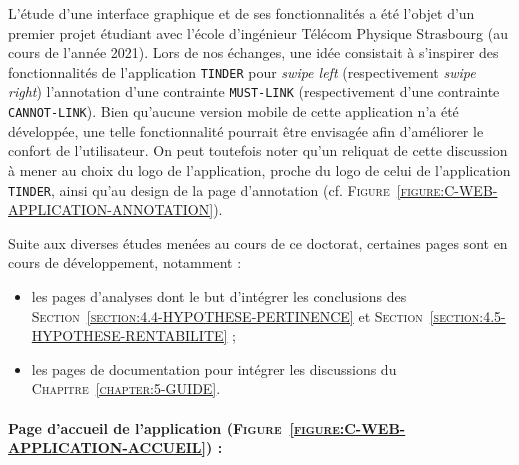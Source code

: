 	\setcounter{localCounterOfFootnoteValue}{\value{footnote}}
	\begin{leftBarInformation}
		L'étude d'une interface graphique et de ses fonctionnalités a été l'objet d'un premier projet étudiant avec l'école d'ingénieur Télécom Physique Strasbourg (au cours de l'année 2021).
		Lors de nos échanges, une idée consistait à s'inspirer des fonctionnalités de l'application \texttt{TINDER} \footnotemark pour \textit{swipe left} (respectivement \textit{swipe right}) l'annotation d'une contrainte \texttt{MUST-LINK} (respectivement d'une contrainte \texttt{CANNOT-LINK}).
		Bien qu'aucune version mobile de cette application n'a été développée, une telle fonctionnalité pourrait être envisagée afin d'améliorer le confort de l'utilisateur.
		On peut toutefois noter qu'un reliquat de cette discussion à mener au choix du logo de l'application, proche du logo de celui de l'application \texttt{TINDER}, ainsi qu'au design de la page d'annotation (cf. \textsc{Figure~\ref{figure:C-WEB-APPLICATION-ANNOTATION}}).
	\end{leftBarInformation}
	
	\begin{leftBarAuthorOpinion}
		Suite aux diverses études menées au cours de ce doctorat, certaines pages sont en cours de développement, notamment :
		\begin{itemize}
			\item les pages d'analyses dont le but d'intégrer les conclusions des \textsc{Section~\ref{section:4.4-HYPOTHESE-PERTINENCE}} et \textsc{Section~\ref{section:4.5-HYPOTHESE-RENTABILITE}} ;
			\item les pages de documentation pour intégrer les discussions du \textsc{Chapitre~\ref{chapter:5-GUIDE}}.
		\end{itemize}
	\end{leftBarAuthorOpinion}
	
	
	\newpage
	\paragraph{Page d'accueil de l'application (\textsc{Figure~\ref{figure:C-WEB-APPLICATION-ACCUEIL}}) :}
		
